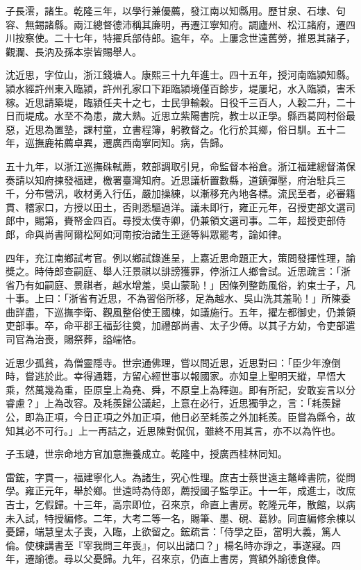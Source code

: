 \begin{pinyinscope}
子長澐，諸生。乾隆三年，以學行兼優薦，發江南以知縣用。歷甘泉、石埭、句容、無錫諸縣。兩江總督德沛稱其廉明，再遷江寧知府。調廬州、松江諸府，遷四川按察使。二十七年，特擢兵部侍郎。逾年，卒。上屢念世遠舊勞，推恩其諸子，觀瀾、長汭及孫本崇皆賜舉人。

沈近思，字位山，浙江錢塘人。康熙三十九年進士。四十五年，授河南臨潁知縣。潁水經許州東入臨潁，許州孔家口下距臨潁境僅百餘步，堤屢圮，水入臨潁，害禾稼。近思請築堤，臨潁任夫十之七，士民爭輸穀。日役千三百人，人穀二升，二十日而堤成。水至不為患，歲大熟。近思立紫陽書院，教士以正學。縣西葛岡村俗最惡，近思為置塾，課村童，立書程簿，躬教督之。化行於其鄉，俗日馴。五十二年，巡撫鹿祐薦卓異，遷廣西南寧同知。病，告歸。

五十九年，以浙江巡撫硃軾薦，敕部調取引見，命監督本裕倉。浙江福建總督滿保奏請以知府揀發福建，檄署臺灣知府。近思議析置數縣，道鎮彈壓，府治駐兵三千，分布營汛，收材勇入行伍，嚴加操練，以漸移充內地各標。流民至者，必審籍貫、稽家口，方授以田土，否則悉驅過洋。議未即行，雍正元年，召授吏部文選司郎中，賜第，賚帑金四百。尋授太僕寺卿，仍兼領文選司事。二年，超授吏部侍郎，命與尚書阿爾松阿如河南按治諸生王遜等糾眾罷考，論如律。

四年，充江南鄉試考官。例以鄉試錄進呈，上嘉近思命題正大，策問發揮性理，諭獎之。時侍郎查嗣庭、舉人汪景祺以誹謗獲罪，停浙江人鄉會試。近思疏言：「浙省乃有如嗣庭、景祺者，越水增羞，吳山蒙恥！」因條列整飭風俗，約束士子，凡十事。上曰：「浙省有近思，不為習俗所移，足為越水、吳山洗其羞恥！」所陳委曲詳盡，下巡撫李衛、觀風整俗使王國棟，如議施行。五年，擢左都御史，仍兼領吏部事。卒，命平郡王福彭往奠，加禮部尚書、太子少傅。以其子方幼，令吏部遣司官為治喪，賜祭葬，謚端恪。

近思少孤貧，為僧靈隱寺。世宗通佛理，嘗以問近思，近思對曰：「臣少年潦倒時，嘗逃於此。幸得通籍，方留心經世事以報國家。亦知皇上聖明天縱，早悟大乘，然萬幾為重，臣原皇上為堯、舜，不原皇上為釋迦。即有所記，安敢妄言以分睿慮？」上為改容。及耗羨歸公議起，上意在必行，近思獨爭之，言：「耗羨歸公，即為正項，今日正項之外加正項，他日必至耗羨之外加耗羨。臣嘗為縣令，故知其必不可行。」上一再詰之，近思陳對侃侃，雖終不用其言，亦不以為忤也。

子玉璉，世宗命地方官加意撫養成立。乾隆中，授廣西桂林同知。

雷鋐，字貫一，福建寧化人。為諸生，究心性理。庶吉士蔡世遠主鼇峰書院，從問學。雍正元年，舉於鄉。世遠時為侍郎，薦授國子監學正。十一年，成進士，改庶吉士，乞假歸。十三年，高宗即位，召來京，命直上書房。乾隆元年，散館，以病未入試，特授編修。二年，大考二等一名，賜筆、墨、硯、葛紗。同直編修余棟以憂歸，端慧皇太子喪，入臨，上欲留之。鋐疏言：「侍學之臣，當明大義，篤人倫。使棟講書至『宰我問三年喪』，何以出諸口？」楊名時亦諍之，事遂寢。四年，遷諭德。尋以父憂歸。九年，召來京，仍直上書房，賞額外諭德食俸。


\end{pinyinscope}
